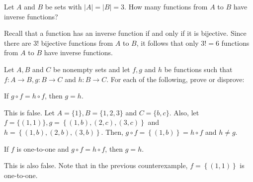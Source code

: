 \documentclass[12pt]{article}
\newenvironment{problem}[2][Problem]{\begin{trivlist} \item[\hskip \labelsep {\bfseries #1}\hskip \labelsep {\bfseries #2.}]}{\end{trivlist}}
\newenvironment{solution}[1][Solution]{\begin{trivlist} \item[\hskip \labelsep {\bfseries #1}]}{\end{trivlist}}
\begin{document}
    \begin{problem}{53}
      Let $A$ and $B$ be sets with $|A|=|B|=3$. How many functions from $A$ to $B$ have inverse functions?
    \begin{solution}
      Recall that a function has an inverse function if and only if it is bijective. Since there are $3!$ bijective functions from $A$ to $B$, it follows that only $3!=6$ functions from $A$ to $B$ have inverse functions.
    \end{solution}
    \end{problem}
    \begin{problem}{56}
      Let $A,B$ and $C$ be nonempty sets and let $f,g$ and $h$ be functions such that $f:A\to B, g:B\to C$ and $h:B\to C$. For each of the following, prove or disprove:
    \begin{enumerate}
      \item If $g\circ f = h\circ f$, then $g=h$.
    \begin{solution}
      This is false. Let $A=\{1\}, B=\{1,2,3\}$ and $C=\{b,c\}$. Also, let $f=\{(1,1)\}, g=\left\{(1,b),(2,c),(3,c)\right\}$ and $h=\left\{ (1,b),(2,b),(3,b) \right\}$. Then, $g\circ f = \left\{ (1,b) \right\}= h\circ f$ and $h\neq g$.
    \end{solution}
      \item If $f$ is one-to-one and $g\circ f = h\circ f$, then $g=h$.
    \begin{solution}
      This is also false. Note that in the previous counterexample, $f=\left\{ (1,1) \right\}$ is one-to-one. 
    \end{solution}
    \end{enumerate}
    \end{problem}
\end{document}
